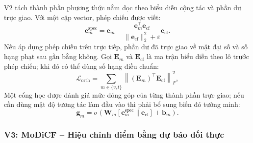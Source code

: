V2 tách thành phần phương thức nằm dọc theo biểu diễn cộng tác và phần dư trực giao. Với một cặp vector, phép chiếu được viết:
\begin{equation}
\mathbf{e}_m^{\text{spec}} = \mathbf{e}_m - \frac{\mathbf{e}_m^\top \mathbf{e}_{\text{cf}}}{\|\mathbf{e}_{\text{cf}}\|_2^2 + \varepsilon} \mathbf{e}_{\text{cf}}.
\end{equation}
Nếu áp dụng phép chiếu trên trực tiếp, phần dư đã trực giao về mặt đại số và số hạng phạt sau gần bằng không. Gọi $\mathbf{E}_m$ và $\mathbf{E}_{\text{cf}}$ là ma trận biểu diễn theo lô trước phép chiếu; khi đó có thể dùng số hạng điều chuẩn:
\begin{equation}
\mathcal{L}_{\text{orth}} = \sum_{m \in \{v, t\}} \left\|\left(\mathbf{E}_m\right)^\top \mathbf{E}_{\text{cf}}\right\|_F^2,
\end{equation}
Một cổng học được đánh giá mức đóng góp của từng thành phần trực giao; nếu cần dùng mật độ tương tác làm đầu vào thì phải bổ sung biến đó tường minh:
\begin{equation}
\mathbf{g}_m = \sigma\left(\mathbf{W}_m [\mathbf{e}_m^{\text{spec}} \parallel \mathbf{e}_{\text{cf}}] + \mathbf{b}_m\right).
\end{equation}

\subsubsection{V3: MoDiCF -- Hiệu chỉnh điểm bằng dự báo đối thực}

